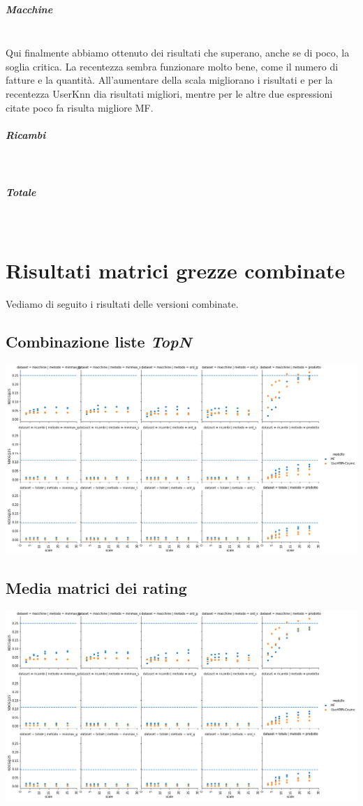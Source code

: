 \subparagraph{Macchine}\mbox{} \\
Qui finalmente abbiamo ottenuto dei risultati che superano, anche se di poco, la soglia critica. La recentezza sembra funzionare molto bene, come il numero di fatture e la quantità. All'aumentare della scala migliorano i risultati e per la recentezza UserKnn dia risultati migliori, mentre per le altre due espressioni citate poco fa risulta migliore MF.


\subparagraph{Ricambi}\mbox{} \\



\subparagraph{Totale}\mbox{} \\








\section{Risultati matrici grezze combinate}
Vediamo di seguito i risultati delle versioni combinate.

\subsection{Combinazione liste \textit{TopN}}
\includegraphics[width=16cm]{figures/comb_1.png}

\subsection{Media matrici dei rating}
\includegraphics[width=16cm]{figures/comb_2.png}

